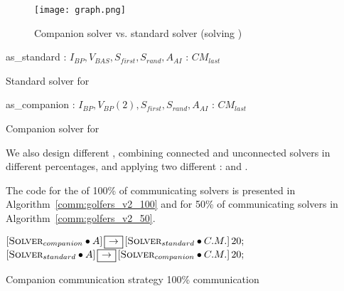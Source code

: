 \begin{figure}
\centering
\texttt{[image: graph.png]} 
\caption{Companion solver vs. standard solver (solving \sgp)}
\label{fig:solversgolfers}
\end{figure}

\begin{algorithm}
\dontprintsemicolon
\SetNoline
{}
   as\_standard\;
\algoindent {} : $I_{BP}, V_{BAS}, S_{first}, S_{rand}, A_{AI}$ \;
\algoindent {} : $CM_{last}$ \;
\caption{Standard solver for \SGP}\label{as:golfers_full}
\end{algorithm}

\begin{algorithm}
\dontprintsemicolon
\SetNoline
{}
   as\_companion\;
\algoindent {} : $I_{BP}, V_{BP}(2), S_{first}, S_{rand}, A_{AI}$ \;
\algoindent {} : $CM_{last}$ \;
\caption{Companion solver for \SGP}\label{as:golfers_partial}
\end{algorithm}

We also design different \commstrs, combining connected and unconnected solvers in different percentages, and applying two different \commopers: \oneTone{} and \oneTn.

The code for the \commstr{} of 100\% of communicating solvers is presented in Algorithm~\ref{comm:golfers_v2_100} and for 50\% of communicating solvers in Algorithm~\ref{comm:golfers_v2_50}. 

\begin{algorithm}[H]
\dontprintsemicolon
\SetNoline
$\left[\eqsolverposl{companion}\posldot A\right] \onetoone \left[\eqsolverposl{standard}\posldot C.M.\right]20;$\;
$\left[\eqsolverposl{standard}\posldot A\right] \onetoone \left[\eqsolverposl{companion}\posldot C.M.\right]20;$
\caption{Companion communication strategy 100\% communication}\label{comm:golfers_v2_100}
\end{algorithm}

